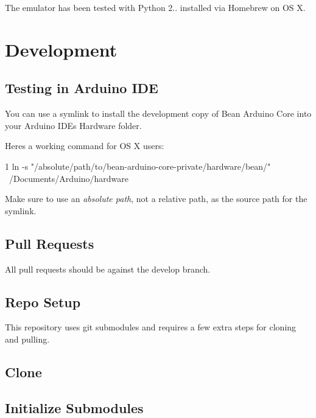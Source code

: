 The emulator has been tested with Python 2.. installed via Homebrew on OS X.

\section*{Development}

\subsection*{Testing in Arduino I\+DE}

You can use a symlink to install the development copy of Bean Arduino Core into your Arduino I\+DE\textquotesingle{}s Hardware folder.

Here\textquotesingle{}s a working command for OS X users\+:


\begin{DoxyCode}
1 ln -s "/absolute/path/to/bean-arduino-core-private/hardware/bean/" ~/Documents/Arduino/hardware
\end{DoxyCode}


Make sure to use an {\itshape absolute path}, not a relative path, as the source path for the symlink.

\subsection*{Pull Requests}

All pull requests should be against the {\ttfamily develop} branch.

\subsection*{Repo Setup}

This repository uses git submodules and requires a few extra steps for cloning and pulling.

\subsection*{Clone}




\subsection*{Initialize Submodules}

